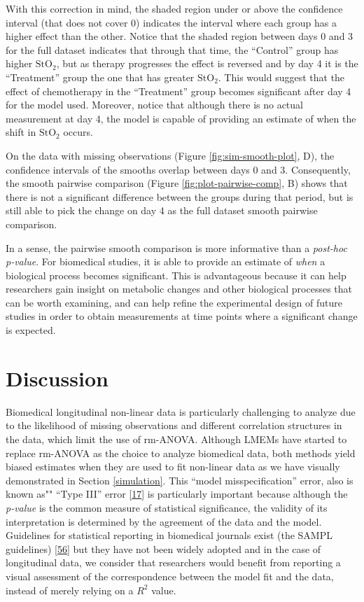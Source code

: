 \documentclass[
]{article}
\begin{document}
With this correction in mind, the shaded region under or above the confidence interval (that does not cover 0) indicates the interval where each group has a higher effect than the other. Notice that the shaded region between days 0 and 3 for the full dataset indicates that through that time, the ``Control'' group has higher \(\mbox{StO}_2\), but as therapy progresses the effect is reversed and by day 4 it is the ``Treatment'' group the one that has greater \(\mbox{StO}_2\). This would suggest that the effect of chemotherapy in the ``Treatment'' group becomes significant after day 4 for the model used. Moreover, notice that although there is no actual measurement at day 4, the model is capable of providing an estimate of when the shift in \(\mbox{StO}_2\) occurs.

On the data with missing observations (Figure \ref{fig:sim-smooth-plot}, D), the confidence intervals of the smooths overlap between days 0 and 3. Consequently, the smooth pairwise comparison (Figure \ref{fig:plot-pairwise-comp}, B) shows that there is not a significant difference between the groups during that period, but is still able to pick the change on day 4 as the full dataset smooth pairwise comparison.

In a sense, the pairwise smooth comparison is more informative than a \emph{post-hoc} \emph{p-value}. For biomedical studies, it is able to provide an estimate of \emph{when} a biological process becomes significant. This is advantageous because it can help researchers gain insight on metabolic changes and other biological processes that can be worth examining, and can help refine the experimental design of future studies in order to obtain measurements at time points where a significant change is expected.

\FloatBarrier

\hypertarget{discussion}{%
\section{Discussion}\label{discussion}}

Biomedical longitudinal non-linear data is particularly challenging to analyze due to the likelihood of missing observations and different correlation structures in the data, which limit the use of rm-ANOVA. Although LMEMs have started to replace rm-ANOVA as the choice to analyze biomedical data, both methods yield biased estimates when they are used to fit non-linear data as we have visually demonstrated in Section \ref{simulation}. This ``model misspecification'' error, also is known as"" ``Type III'' error {[}\protect\hyperlink{ref-dennis2019}{17}{]} is particularly important because although the \emph{p-value} is the common measure of statistical significance, the validity of its interpretation is determined by the agreement of the data and the model. Guidelines for statistical reporting in biomedical journals exist (the SAMPL guidelines) {[}\protect\hyperlink{ref-lang2015}{56}{]} but they have not been widely adopted and in the case of longitudinal data, we consider that researchers would benefit from reporting a visual assessment of the correspondence between the model fit and the data, instead of merely relying on a \(R^2\) value.
\end{document}
